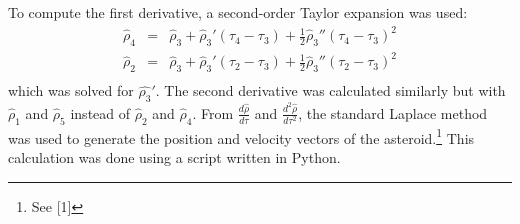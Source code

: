 \documentclass[12pt,journal,compsoc]{IEEEtran}
\begin{document}

To compute the first derivative, a second-order Taylor expansion was used:
\begin{eqnarray*}
\hat{\rho}_4&=&\hat{\rho}_3+\hat{\rho}_3' (\tau_4-\tau_3)+\frac{1}{2}\hat{\rho}_3'' (\tau_4-\tau_3)^2\\
\hat{\rho}_2&=&\hat{\rho}_3+\hat{\rho}_3' (\tau_2-\tau_3)+\frac{1}{2}\hat{\rho}_3'' (\tau_2-\tau_3) ^2\\
\end{eqnarray*}
which was solved for $\hat{\rho_3}'$.
The second derivative was calculated similarly but with $\hat{\rho}_1$ and $\hat{\rho}_5$ 
instead of $\hat{\rho}_2$ and $\hat{\rho}_4$.
From $\frac{d\hat{\rho}}{d\tau}$ and $\frac{d^2\hat{\rho}}{d\tau^2}$, 
the standard Laplace method was used to generate the position and velocity vectors of the asteroid.\footnote{See [1]}
This calculation was done using a script written in Python.
\end{document}
